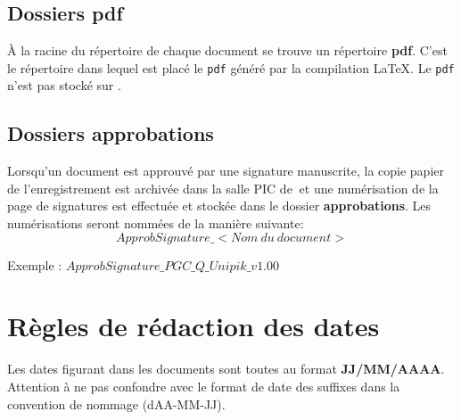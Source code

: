 \subsection{Dossiers pdf}

\`{A} la racine du répertoire de chaque document se trouve un répertoire \textbf{pdf}. C'est
le répertoire dans lequel est placé le \verb+pdf+ généré par la compilation \LaTeX{}. Le \verb+pdf+ n'est pas stocké sur \git{}.

\subsection{Dossiers approbations}

Lorsqu'un document est approuvé par une signature manuscrite, la copie papier de l'enregistrement est archivée dans la salle PIC de  \nomEquipe$\ $et une numérisation de la page de signatures est effectuée et stockée dans le dossier \textbf{approbations}. Les numérisations seront nommées de la manière suivante:
\[
ApprobSignature\_<Nom\ du\ document>
\]

Exemple : $ApprobSignature\_PGC\_Q\_Unipik\_v1.00$

\section{Règles de rédaction des dates}

Les dates figurant dans les documents sont toutes au format \textbf{JJ/MM/AAAA}. Attention à ne pas confondre avec le format de date des  suffixes dans la convention de nommage (dAA-MM-JJ).

